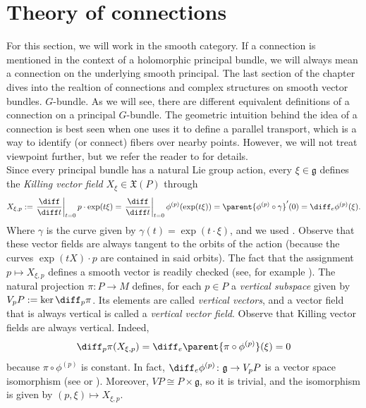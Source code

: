 \section{Theory of connections}
For this section, we will work in the smooth category. If a connection is mentioned in the context of a holomorphic principal bundle, we will always mean a connection on the underlying smooth principal. The last section of the chapter dives into the realtion of connections and complex structures on smooth vector bundles. \(G\)-bundle. As we will see, there are different equivalent definitions of a connection on a principal \(G\)-bundle. The geometric intuition behind the idea of a connection is best seen when one uses it to define a parallel transport, which is a way to identify (or connect) fibers over nearby points. However, we will not treat viewpoint further, but we refer the reader to \parencite[Sec. 1.7]{Rudolph_2017pug} for details. \\

Since every principal bundle has a natural Lie group action, every \(\xi \in \mathfrak{g}\) defines the \textit{Killing vector field} \(X_\xi \in \mathfrak{X}(P)\) through
\begin{equation} \label{def_Killing}
    X_{\xi,p}:=\left. \frac{\diff}{\diff t} \right|_{t=0} p \cdot \exp(t \xi)=\left. \frac{\diff}{\diff t} \right|_{t=0} \phi^{(p)}(\exp(t\xi))=\parent{\phi^{(p)}\circ \gamma}'(0)=\diff_e\phi^{(p)}(\xi).
\end{equation}
Where \(\gamma\) is the curve given by \(\gamma(t)=\exp(t\cdot \xi)\), and we used \parencite[Cor. 3.25]{lee_introSM}. Observe that these vector fields are always tangent to the orbits of the action (because the curves \(\exp(tX)\cdot p\) are contained in said orbits). The fact that the assignment \(p \mapsto X_{\xi, p}\) defines a smooth vector is readily checked (see, for example \parencite[Prop. 27.11]{tu2017differential}). The natural projection \(\pi \colon P \to M\) defines, for each \(p \in P\) a \textit{vertical subspace} given by \(V_pP:=\ker \diff_p\pi\). Its elements are called \textit{vertical vectors}, and a vector field that is always vertical is called a \textit{vertical vector field}. Observe that Killing vector fields are always vertical. Indeed,
\[
\diff_p\pi(X_{\xi,p})= \diff_e\parent{\pi \circ \phi^{(p)}}(\xi) = 0
\]
because \(\pi \circ \phi^{(p)}\) is constant. In fact, \(\diff_e \phi^{(p)}\colon \mathfrak{g} \to V_pP\) is a vector space isomorphism (see \parencite[Lemma 1.3.1]{Rudolph_2017pug} or \parencite[Prop. 27.18]{tu2017differential}). Moreover, \(VP \cong P \times \mathfrak{g}\), so it is trivial, and the isomorphism is given by \((p, \xi) \mapsto X_{\xi, p}\).

